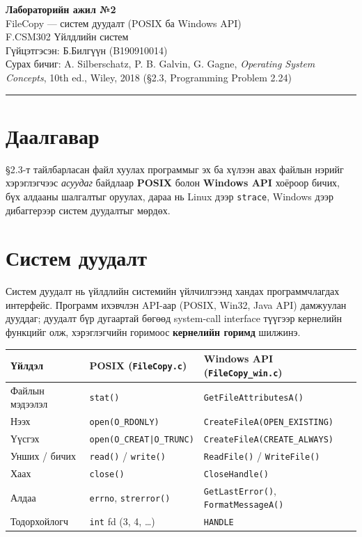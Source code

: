 \documentclass[12pt,a4paper]{article}
\begin{document}
\begin{center}
  {\Large\bfseries Лабораторийн ажил №2}\\[0.4em]
  {\large FileCopy — систем дуудалт (POSIX ба Windows API)}\\[0.8em]
  F.CSM302 Үйлдлийн систем\\
  Гүйцэтгэсэн: Б.Билгүүн (B190910014)\\[0.3em]
  Сурах бичиг: A. Silberschatz, P. B. Galvin, G. Gagne, \textit{Operating System Concepts}, 10th ed., Wiley, 2018 (§2.3, Programming Problem 2.24)
\end{center}
\hrule
\bigskip

\section{Даалгавар}
§2.3-т тайлбарласан файл хуулах программыг эх ба хүлээн авах файлын нэрийг хэрэглэгчээс \emph{асуудаг} байдлаар \textbf{POSIX} болон \textbf{Windows API} хоёроор бичих, бүх алдааны шалгалтыг оруулах, дараа нь Linux дээр \texttt{strace}, Windows дээр дибаггерээр систем дуудалтыг мөрдөх.

\section{Систем дуудалт}
Систем дуудалт нь үйлдлийн системийн үйлчилгээнд хандах программчлагдах интерфейс. Программ ихэвчлэн API-аар (POSIX, Win32, Java API) дамжуулан дууддаг; дуудалт бүр дугаартай бөгөөд system-call interface түүгээр кернелийн функцийг олж, хэрэглэгчийн горимоос \textbf{кернелийн горимд} шилжинэ.

\begin{center}
\begin{tabular}{lll}
\toprule
Үйлдэл & POSIX (\texttt{FileCopy.c}) & Windows API (\texttt{FileCopy\_win.c})\\
\midrule
Файлын мэдээлэл & \texttt{stat()} & \texttt{GetFileAttributesA()}\\
Нээх & \texttt{open(O\_RDONLY)} & \texttt{CreateFileA(OPEN\_EXISTING)}\\
Үүсгэх & \texttt{open(O\_CREAT|O\_TRUNC)} & \texttt{CreateFileA(CREATE\_ALWAYS)}\\
Унших / бичих & \texttt{read()} / \texttt{write()} & \texttt{ReadFile()} / \texttt{WriteFile()}\\
Хаах & \texttt{close()} & \texttt{CloseHandle()}\\
Алдаа & \texttt{errno}, \texttt{strerror()} & \texttt{GetLastError()}, \texttt{FormatMessageA()}\\
Тодорхойлогч & \texttt{int} fd (3, 4, …) & \texttt{HANDLE}\\
\bottomrule
\end{tabular}
\end{center}
\end{document}
